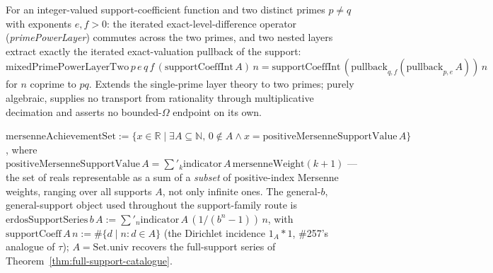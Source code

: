 \begin{lem}
\label{lem:mixed-prime-power-layer}
For an integer-valued support-coefficient function and two distinct primes $p\ne q$ with
exponents $e,f>0$: the iterated exact-level-difference operator (\emph{primePowerLayer})
commutes across the two primes, and two nested layers extract exactly the iterated
exact-valuation pullback of the support:
$\mathrm{mixedPrimePowerLayerTwo}\,p\,e\,q\,f\,(\mathrm{supportCoeffInt}\,A)\,n =
\mathrm{supportCoeffInt}\,(\mathrm{pullback}_{q,f}(\mathrm{pullback}_{p,e}\,A))\,n$ for
$n$ coprime to $pq$. Extends the single-prime layer theory to two primes; purely
algebraic, supplies no transport from rationality through multiplicative decimation and
asserts no bounded-$\Omega$ endpoint on its own.
\par{}
\end{lem}

\begin{defn}
\label{defn:achievement-set}
$\mathrm{mersenneAchievementSet} := \{x\in\mathbb R \mid \exists A\subseteq\mathbb N,\,
0\notin A \land x = \mathrm{positiveMersenneSupportValue}\,A\}$, where
$\mathrm{positiveMersenneSupportValue}\,A = \sum'_k \mathrm{indicator}\,A\,
\mathrm{mersenneWeight}(k{+}1)$ — the set of reals representable as a sum of a
\emph{subset} of positive-index Mersenne weights, ranging over all supports $A$, not only
infinite ones. The general-$b$, general-support object used throughout the support-family
route is $\mathrm{erdosSupportSeries}\,b\,A := \sum'_n \mathrm{indicator}\,A\,
(1/(b^n-1))\,n$, with $\mathrm{supportCoeff}\,A\,n := \#\{d\mid n : d\in A\}$ (the
Dirichlet incidence $1_A * 1$, \#257's analogue of $\tau$); $A=\mathrm{Set.univ}$
recovers the full-support series of Theorem~\ref{thm:full-support-catalogue}.
\par{}
\end{defn}

